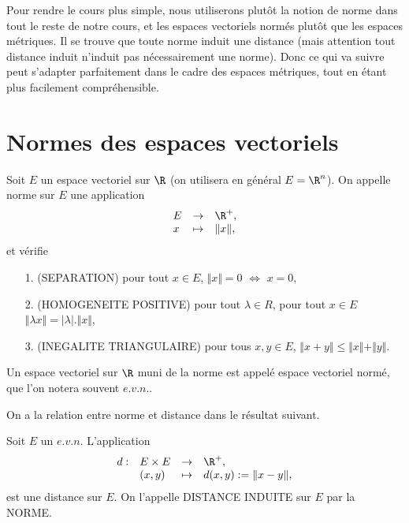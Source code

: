 \documentclass[class=report,crop=false]{standalone}
\begin{document}
 \noindent Pour rendre le cours plus simple, nous utiliserons plutôt la notion de norme dans tout le reste de notre cours, et les espaces vectoriels normés plutôt que les espaces métriques. Il se trouve que toute norme induit une distance (mais attention tout distance induit n'induit pas nécessairement une norme). Donc ce qui va suivre peut s'adapter parfaitement
 dans le cadre des espaces métriques, tout en étant plus facilement compréhensible.

\section{Normes des espaces vectoriels}

\begin{definition}[NORME]
\textcolor[rgb]{0.73,0.00,0.00}{
\noindent Soit $E$ un espace vectoriel sur $\R$ (on utilisera en général $E=\R^n$). On appelle norme sur $E$ une
application 
\begin{equation*}
\begin{array}{lll}
E & \rightarrow & \R^+,\\
x & \mapsto & \Vert x\Vert,
\end{array}
\end{equation*}
et vérifie
\begin{itemize}
\item[1.](SEPARATION) pour tout $x \in E$, $\Vert x \Vert =0$ $\Longleftrightarrow$ $x=0$,
\item[2.](HOMOGENEITE POSITIVE) pour tout $\lambda \in R$, pour tout $x\in E$ 
$\Vert \lambda x \Vert=\vert \lambda \vert . \Vert x \Vert$,
\item[3.](INEGALITE TRIANGULAIRE) pour tous $x,y \in E$, $\Vert x+y\Vert \leq \Vert x\Vert + \Vert y\Vert$.
\end{itemize}
}
\end{definition}



\begin{definition}
\textcolor[rgb]{0.73,0.00,0.00}{
\noindent Un espace vectoriel sur $\R$ muni de la norme est appelé espace vectoriel normé, 
que l'on notera souvent $e.v.n.$.
}
\end{definition}

\noindent On a la relation entre norme et distance dans le résultat suivant.


\begin{proposition}
\textcolor[rgb]{0.50,0.00,0.25}{
Soit $E$ un $e.v.n.$ L'application
\begin{equation*}
\begin{array}{llll}
d:&E \times E & \rightarrow & \R^+,\\
 & (x,y) & \mapsto & d(x,y):=\Vert x-y\Vert,
\end{array}
\end{equation*}
est une distance sur $E$. On l'appelle DISTANCE INDUITE sur $E$ par la NORME.
}
\end{proposition}
\end{document}
